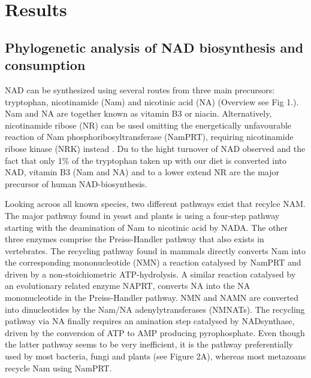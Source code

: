 
\section{Results}

\subsection{Phylogenetic analysis of NAD biosynthesis and consumption}

NAD can be synthesized using several routes from three main precursors: tryptophan, nicotinamide (Nam) and nicotinic acid (NA) (Overview see Fig 1.). Nam and NA are together known as vitamin B3 or niacin. Alternatively, nicotinamide ribose (NR) can be used omitting the energetically unfavourable reaction of Nam phosphoribosyltransferase (NamPRT), requiring nicotinamide ribose kinase (NRK) instead \cite{Yoshino2018}. Du to the hight turnover of NAD observed and the fact that only 1\% of the tryptophan taken up with our diet is converted into NAD, vitamin B3 (Nam and NA) and to a lower extend NR are the major precursor of human NAD-biosynthesis.

Looking acroos all known species,   two different pathways exist that recylce NAM. The major pathway found in yeast and plants is using a four-step pathway starting with the deamination of Nam to nicotinic acid by NADA. The other three enzymes comprise the Preiss-Handler pathway that also exists in vertebrates. The recycling pathway found in mammals directly converts Nam into the corresponding mononucleotide (NMN) a reaction catalysed by NamPRT and driven by a non-stoichiometric ATP-hydrolysis. A similar reaction catalysed by an evolutionary related enzyme NAPRT, converts NA into the NA mononucleotide in the Preiss-Handler pathway. NMN and NAMN are converted into dinucleotides by the Nam/NA adenylytransferases (NMNATs). The recycling pathway via NA finally requires an amination step catalysed by NADsynthase, driven by the conversion of ATP to AMP producing pyrophosphate. Even though the latter pathway seems to be very inefficient, it is the pathway preferentially used by most bacteria, fungi and plants (see Figure 2A), whereas most metazoans recycle Nam using NamPRT.

